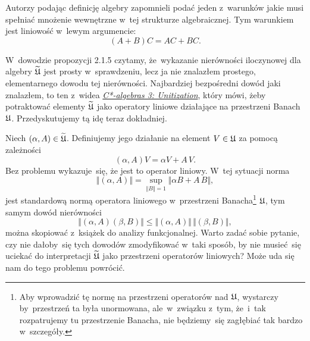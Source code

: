 \documentclass[a4paper,11pt]{article}
\numberwithin{equation}{section}
\begin{document}
\noindent
{} Autorzy podając definicję algebry zapomnieli podać jeden z~warunków
jakie musi spełniać mnożenie wewnętrzne w~tej strukturze algebraicznej. Tym
warunkiem jest liniowość w~lewym argumencie:
\begin{equation}
  \label{eq:Bratteli-Robinson-Operator-Algebras-ETC-Vol-I-s01-01}
  ( A + B ) C = A C + B C.
\end{equation}

\VerSpaceFour





\noindent
{} W~dowodzie propozycji 2.1.5 czytamy, że~wykazanie nierówności
iloczynowej dla algebry $\widetilde{\mathfrak{U}}$ jest prosty w~sprawdzeniu, lecz ja nie
znalazłem prostego, elementarnego dowodu tej nierówności. Najbardziej
bezpośredni dowód jaki znalazłem, to ten z~widea
\href{https://www.youtube.com/watch?v=6NC0UWjDcBQ}{\textit{C*-algebras 3:
    Unitization}}, który mówi, żeby
potraktować elementy $\widetilde{\mathfrak{U}}$ jako operatory liniowe działające
na przestrzeni Banach $\mathfrak{U}$. Przedyskutujemy tą idę teraz dokładniej.

Niech $( \alpha, A ) \in \widetilde{\mathfrak{U}}$. Definiujemy jego działanie na element
$V \in \mathfrak{U}$ za pomocą zależności
\begin{equation}
  \label{eq:Bratteli-Robinson-Operator-Algebras-ETC-Vol-I-s01-02}
  ( \alpha, A ) V = \alpha V + A \, V.
\end{equation}
Bez problemu wykazuje~się, że jest to operator liniowy. W~tej sytuacji
norma
\begin{equation}
  \label{eq:Bratteli-Robinson-Operator-Algebras-ETC-Vol-I-s01-03}
  \Vert ( \alpha, A ) \Vert =
  \sup_{ \Vert B \Vert = 1 } \Vert \alpha B + A \, B \Vert,
\end{equation}
jest standardową normą operatora liniowego w~przestrzeni
Banacha\footnote{Aby wprowadzić tę normę na przestrzeni operatorów nad
  $\mathfrak{U}$, wystarczy by~przestrzeń ta była unormowana, ale~w~związku
  z~tym, że~i~tak rozpatrujemy tu przestrzenie Banacha, nie będziemy~się
  zagłębiać tak bardzo w~szczegóły.}
$\mathfrak{U}$, tym samym dowód nierówności
\begin{equation}
  \label{eq:Bratteli-Robinson-Operator-Algebras-ETC-Vol-I-s01-04}
  \Vert ( \alpha, A ) ( \beta, B ) \Vert \leq
  \Vert ( \alpha, A ) \Vert \, \Vert ( \beta, B ) \Vert,
\end{equation}
można skopiować z~książek do analizy funkcjonalnej. Warto zadać sobie
pytanie, czy nie dałoby~się tych dowodów zmodyfikować w~taki sposób, by nie
musieć~się uciekać do interpretacji $\widetilde{\mathfrak{U}}$ jako przestrzeni
operatorów liniowych? Może uda się nam do tego problemu powrócić.
\end{document}
